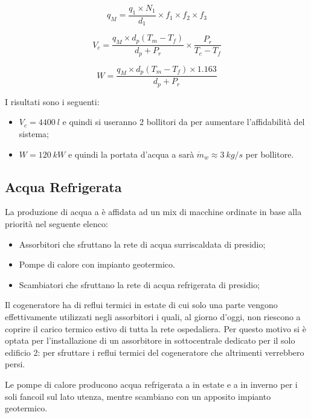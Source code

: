 \begin{equation}
q_M=\frac{q_1\times N_1}{d_1}\times f_1 \times f_2 \times f_3
\label{qm}
\end{equation}

\begin{equation}
	V_c=\frac{q_M \times d_p(T_m-T_f)}{d_p+P_r}\times \frac{P_r}{T_c-T_f}
	\label{preparatore}
\end{equation}

\begin{equation}
	W=\frac{q_M \times d_p (T_m-T_f)\times 1.163}{d_p+P_r}
	\label{serpentino}
\end{equation}

I risultati sono i seguenti:
\begin{itemize}
	\item $V_c = \SI{4400}{l}$ e quindi si useranno 2 bollitori da  per aumentare l'affidabilità del sistema;
	\item $W= \SI{120}{kW}$ e quindi la portata d'acqua a  sarà $\dot{m}_w\approx\SI{3}{kg/s}$ per bollitore.
\end{itemize}

\subsection{Acqua Refrigerata}
La produzione di acqua a  è affidata ad un mix di macchine ordinate in base alla priorità nel seguente elenco:
\begin{itemize}
	\item Assorbitori che sfruttano la rete di acqua surriscaldata di presidio;
	\item Pompe di calore con impianto geotermico.	
	\item Scambiatori che sfruttano la rete di acqua refrigerata di presidio;
\end{itemize}
Il cogeneratore ha  di reflui termici in estate di cui solo una parte vengono effettivamente utilizzati negli assorbitori i quali, al giorno d'oggi, non riescono a coprire il carico termico estivo di tutta la rete ospedaliera. Per questo motivo si è optata per l'installazione di un assorbitore in sottocentrale dedicato per il solo edificio 2: per sfruttare i reflui termici del cogeneratore che altrimenti verrebbero persi.

Le pompe di calore producono acqua refrigerata a  in estate e a  in inverno per i soli fancoil sul lato utenza, mentre scambiano con un apposito impianto geotermico.

